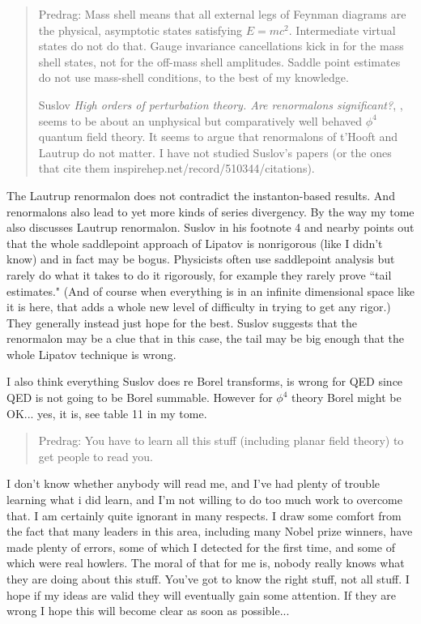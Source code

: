 \begin{description}
\begin{quote} Predrag:
Mass shell means that all external legs of Feynman diagrams are the
physical, asymptotic states satisfying $E = mc^2$. Intermediate virtual
states do not do that. Gauge invariance cancellations kick in for the
mass shell states, not for the off-mass shell amplitudes. Saddle point
estimates do not use mass-shell conditions, to the best of my knowledge.

Suslov
   {\em High orders of perturbation theory. {Are} renormalons significant?},
    ,
    seems to be about an unphysical but comparatively well behaved
$\phi^4$ quantum field theory.
It seems to argue that renormalons of t'Hooft and Lautrup do not matter. I
   have not studied Suslov's papers (or the ones that cite
   them 
   {inspirehep.net/record/510344/citations}).
\end{quote}
The Lautrup renormalon does not contradict the instanton-based results.
And renormalons also lead to yet more kinds of series divergency.
By the way my tome also discusses Lautrup renormalon.
Suslov in his footnote 4 and nearby points out that the whole
saddlepoint approach of Lipatov is nonrigorous (like I didn't know)
and in fact may be bogus.   Physicists often
use saddlepoint analysis but rarely do what it takes to do it
rigorously, for example they
rarely prove ``tail estimates."  (And of course when everything is in
an infinite dimensional space like it is here, that adds a whole new
level of difficulty in trying
to get any rigor.)  They generally instead just hope for the best.
Suslov suggests that the renormalon may be a clue that in this case, the
tail may be big enough that the whole Lipatov technique is wrong.

I also think everything Suslov does re Borel transforms, is wrong for QED since
QED is not going to be Borel summable.  However for $\phi^4$ theory
Borel might be OK... yes, it is, see table 11 in my tome.


\begin{quote} Predrag:
   You have to learn all this stuff (including
   {planar field theory}) to get people to read you.
\end{quote}

I don't know whether anybody will read me, and I've had plenty of
trouble learning what i did learn, and I'm not willing to do too much
work to overcome that.
 I am certainly quite ignorant in many respects.  I draw some comfort
from the fact that many leaders in this area, including many Nobel
prize winners, have made plenty of errors, some of which I detected
for the first time, and some of which were real howlers.   The moral
of that for me is, nobody really knows what they are doing about this
stuff.  You've got to know the right stuff, not all stuff.  I hope if
my ideas are valid they will eventually gain some attention. If they
are wrong I hope this will become clear as soon as possible...

\end{description}
